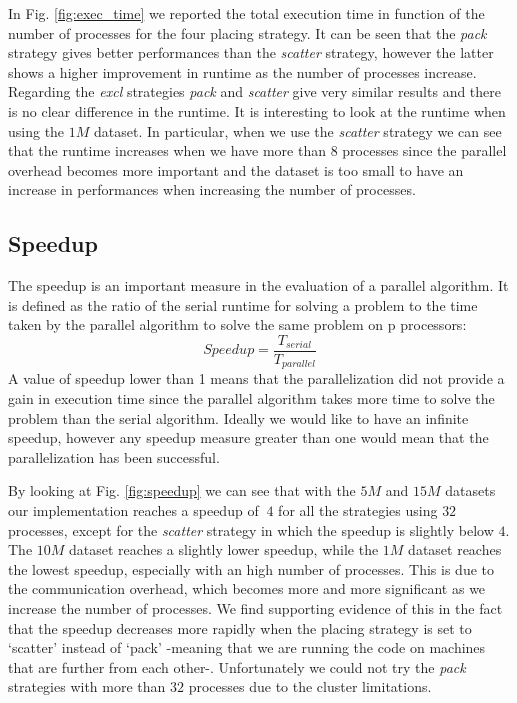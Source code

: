 In Fig. \ref{fig:exec_time} we reported the total execution time in function of the number of processes for the four placing strategy.
It can be seen that the \textit{pack} strategy gives better performances than the \textit{scatter} strategy, however
the latter shows a higher improvement in runtime as the number of processes increase. Regarding the \textit{excl} strategies
\textit{pack} and \textit{scatter} give very similar results and there is no clear difference in the runtime.
It is interesting to look at the runtime when using the $1M$ dataset. In particular, when we use the \textit{scatter} strategy we can
see that the runtime increases when we have more than $8$ processes since the parallel overhead becomes more important and the dataset is too
small to have an increase in performances when increasing the number of processes.

\subsection{Speedup}
The speedup is an important measure in the evaluation of a parallel algorithm.
It is defined as the ratio of the serial runtime for solving a problem to the time taken by the
parallel algorithm to solve the same problem on p processors:
\begin{equation}
  Speedup = \frac{T_{serial}}{T_{parallel}}
\end{equation}
A value of speedup lower than 1 means that the parallelization did not provide a gain in execution time
since the parallel algorithm takes more time to solve the problem than the serial algorithm.
Ideally we would like to have an infinite speedup, however any speedup measure greater than one would
mean that the parallelization has been successful.

By looking at Fig. \ref{fig:speedup} we can see that with the $5M$ and $15M$ datasets our implementation reaches a speedup of $~4$ for
all the strategies using $32$ processes, except for the \textit{scatter} strategy in which the speedup
is slightly below $4$.
The $10M$ dataset reaches a slightly lower speedup, while the $1M$ dataset reaches the lowest speedup, especially
with an high number of processes. This is due to the communication overhead, which becomes more and more significant as we increase the number of processes. We find supporting evidence of this in the fact that the speedup decreases more rapidly when the placing strategy is set to `scatter' instead of `pack' -meaning that we are running the code on machines that are further from each other-.
Unfortunately we could not try the \textit{pack} strategies with more than $32$ processes due to the cluster limitations.

